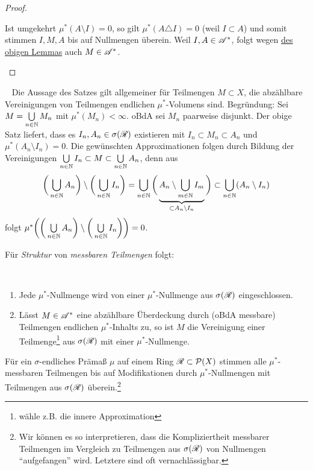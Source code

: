 \begin{satz}
\begin{proof}
\begin{itemize}
 Ist umgekehrt $\mu^*(A\setminus I)=0$, so gilt $\mu^*(A\triangle I)=0$ (weil $I \subset A$)  und somit stimmen $I,M,A$ bis auf Nullmengen überein. Weil $I,A \in \AA^*$, folgt wegen \hyperref[uebereinstimmen]{des obigen Lemmas} auch $M \in \AA^*$.
\end{itemize}
\end{proof}
\begin{remark}\
 Die Aussage des Satzes gilt allgemeiner für Teilmengen $M\subset X$, die abzählbare Vereinigungen von Teilmengen endlichen $\mu^*$-Volumens sind. Begründung: Sei $M=\bigcup\limits_{n\in\N}M_n$ mit $\mu^*(M_n)<\infty$. oBdA sei $M_n$ paarweise disjunkt. Der obige Satz liefert, dass es $I_n, A_n \in \sigma(\RR)$ existieren mit $I_n \subset M_n \subset A_n$ und $\mu^*(A_n \setminus I_n)=0$. Die gewünschten Approximationen folgen durch Bildung der Vereinigungen $\bigcup\limits_{n \in \N}I_n \subset M \subset \bigcup\limits_{n\in\N}A_n$, denn aus
$$\bigg( 
\bigcup\limits_{n\in\N} A_n
\bigg) \setminus \bigg(
\bigcup\limits_{n\in \N} I_n
\bigg) =
\bigcup_{n \in \N} \bigg(\underbrace{A_n \setminus \bigcup_{m\in\N}I_m}_{\subset A_n \setminus I_n} \bigg) \subset \bigcup_{n \in \N} (A_n \setminus I_n)$$
folgt $\mu^*\bigg( \bigg( \bigcup\limits_{n\in \N}A_n \bigg)\setminus \bigg( \bigcup\limits_{n \in \N} I_n \bigg)  \bigg)=0$.
\end{remark}
\end{satz}

Für \emph{Struktur} von \emph{messbaren Teilmengen} folgt:
\begin{korollar}\
\begin{mdframed}
\begin{enumerate}[label=(\roman*)]
\item Jede $\mu^*$-Nullmenge wird von einer $\mu^*$-Nullmenge aus $\sigma(\RR)$ eingeschlossen.
\item Lässt $M \in \AA^*$ eine abzählbare Überdeckung durch (oBdA messbare) Teilmengen endlichen $\mu^*$-Inhalts zu, so ist $M$ die Vereinigung einer Teilmenge\footnote{wähle z.B. die innere Approximation} aus $\sigma(\RR)$ mit einer $\mu^*$-Nullmenge.
\end{enumerate}
\end{mdframed}
\end{korollar}

\begin{korollar} \label{uebereinstimmung-alg}
\begin{mdframed}
Für ein $\sigma$-endliches Prämaß $\mu$ auf einem Ring $\RR \subset \PP(X)$ stimmen alle $\mu^*$-messbaren Teilmengen bis auf Modifikationen durch $\mu^*$-Nullmengen mit Teilmengen aus $\sigma(\RR)$ überein.\footnote{Wir können es so interpretieren, dass die Kompliziertheit messbarer Teilmengen im Vergleich zu Teilmengen aus $\sigma(\RR)$ von Nullmengen ``aufgefangen'' wird. Letztere sind oft vernachlässigbar.}
\end{mdframed}
\end{korollar}

